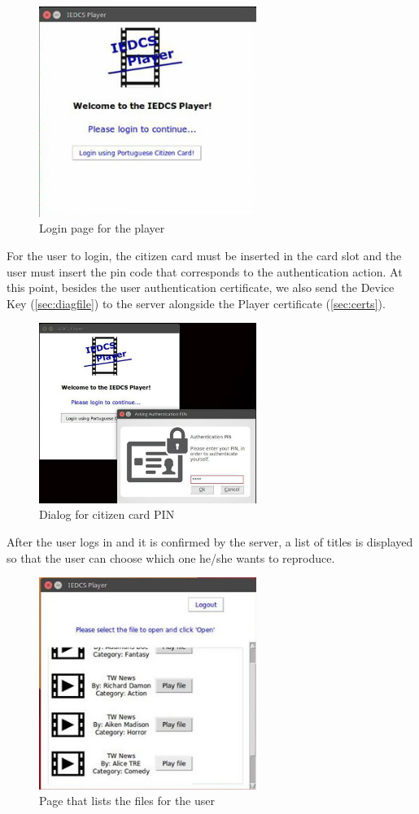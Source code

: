 \documentclass[11pt,a4paper]{report}
\begin{document}
\begin{figure}[H]
\centerline{\includegraphics[width=200pt]{images/playerLogin.jpg}}
\caption{Login page for the player}
\label{player}
\end{figure}

For the user to login, the citizen card must be inserted in the card slot and the user must insert the pin code that corresponds to the authentication action. At this point, besides the user authentication certificate, we also send the Device Key (\autoref{sec:diagfile}) to the server alongside the Player certificate (\autoref{sec:certs}).

\begin{figure}[H]
\centerline{\includegraphics[width=200pt]{images/playerLogin2.jpg}}
\caption{Dialog for citizen card PIN}
\label{player}
\end{figure}


After the user logs in and it is confirmed by the server, a list of titles is displayed so that the user can choose which one he/she wants to reproduce.

\begin{figure}[H]
\centerline{\includegraphics[width=200pt]{images/playerList.jpg}}
\caption{Page that lists the files for the user}
\label{player}
\end{figure}
\end{document}
